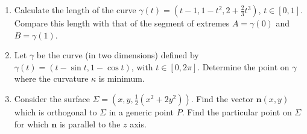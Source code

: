 \documentclass[fleqn]{article}
\begin{document}
\begin{enumerate}
    \item Calculate the length of the curve $\gamma(t) =( t-1, 1-t^2, 2 + \frac{2}{3}t^3)$, $t\in[0,1]$.
    Compare this length with that of the segment of extremes $A=\gamma(0)$ and $B=\gamma(1)$.



    \item Let $\gamma$ be the curve (in two dimensions) defined by $\gamma(t)=(t-\sin t, 
    1-\cos t)$, with $t\in[0,2\pi]$.  Determine the point on $\gamma$ where the curvature $\kappa$ is minimum.


    \item Consider the surface $\Sigma=(x,y, \frac{1}{2}(x^2 + 2 y^2))$. Find the vector $\mathbf{n}(x,y)$ which is orthogonal to $\Sigma$ in a generic point $P$.  Find the particular point on $\Sigma$ for which $\mathbf{n}$ is parallel to the $z$ axis. 

  \end{enumerate}
\end{document}
